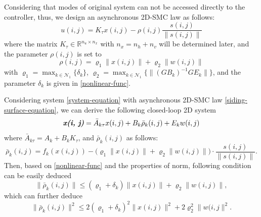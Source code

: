\documentclass[journal,final,twocolumn]{IEEEtran}
\begin{document}
 	Considering that modes of original system can not be  accessed  directly to the controller,  thus, we design an asynchronous 2D-SMC law as follows:
	\begin{equation}\label{smc-law}
		u(i,j) = K_{\tau }x(i,j)-\rho(i,j)\frac{s(i,j)}{\|s(i,j)\|}
	\end{equation}
	where the matrix $K_{\tau }\in\mathbb{R}^{n_u\times n_x}$ with $n_x=n_h+n_v$ will be determined later, and the parameter $\rho(i,j)$ is set to
	\begin{equation}\label{varrho}
	\rho(i,j) = \varrho_{1}\|x(i,j)\| + \varrho_{2}\|w(i,j)\|
	\end{equation}
	with $\varrho_{1}=\max_{k\in\mathcal{N}_{1}} \{\delta_{k} \}$, $\varrho_{2} = \max_{k\in\mathcal{N}_{1}}\{\|(GB_{k})^{-1}GE_{k}\| \} $, and the parameter $\delta_{k}$ is given in \eqref{nonlinear-func}. 
	
	Considering system \eqref{system-equation} with asynchronous 2D-SMC law \eqref{siding-surface-equation}, we can derive the following closed-loop 2D system 
	\begin{equation} \label{closed-loop-system-equation}
	\emph{\textbf{x(i, j)}} = \bar{A}_{k\tau }x(i,j)+B_{k}\bar{\rho}_{k}(i,j)+E_{k}w(i,j)
	\end{equation}
	where $\bar{A}_{k\tau } = A_{k}+B_{k}K_{\tau }$, and $\bar{\rho}_{k}(i,j)$ as follows:
	\begin{equation*}
	\bar\rho_{k}(i,j)=f_{k}(x(i,j))-\big(\varrho_{1}\|x(i,j)\|+\varrho_{2}\|w(i,j)\|\big)\cdot\frac{s(i,j)}{\|s(i,j)\|}.
	\end{equation*}
	Then, based on \eqref{nonlinear-func} and the properties of norm, following condition can be easily deduced 
	\begin{equation}\label{norm-rho-inequality}
	\|\bar{\rho}_{k}(i,j)\| \leq (\varrho_{1}+\delta_{k})\|x(i,j)\| + \varrho_{2}\|w(i,j)\| ,
	\end{equation} 
	which can further deduce
	\begin{equation}\label{rholeseq}
	\|\bar{\rho}_{k}(i,j)\|^{2} \leq 2(\varrho_{1}+\delta_{k})^{2}\|x(i,j)\|^{2} +2\varrho_{2}^{2}\|w(i,j\|^{2} .
	\end{equation}	
	
\end{document}
